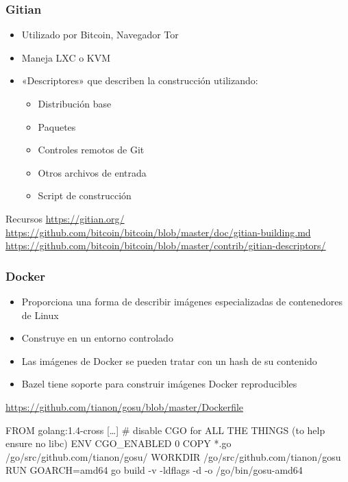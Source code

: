 \documentclass[14pt,aspectratio=169]{beamer}
\begin{document}
\begin{frame}
 \frametitle{Gitian}

 \begin{itemize}
  \item Utilizado por Bitcoin, Navegador Tor
  \item Maneja LXC o KVM
  \item «Descriptores» que describen la construcción utilizando:
   \begin{itemize}
    \item Distribución base
    \item Paquetes
    \item Controles remotos de Git
    \item Otros archivos de entrada
    \item Script de construcción
   \end{itemize}
 \end{itemize}

 \vfill
 \begin{block}{\footnotesize Recursos}\footnotesize
 \url{https://gitian.org/}\\
 \url{https://github.com/bitcoin/bitcoin/blob/master/doc/gitian-building.md}\\
 \url{https://github.com/bitcoin/bitcoin/blob/master/contrib/gitian-descriptors/}
 \end{block}
\end{frame}

\begin{frame}[fragile]
 \frametitle{Docker}

 \begin{itemize}
  \item Proporciona una forma de describir imágenes especializadas de contenedores de Linux
  \item Construye en un entorno controlado
  \item Las imágenes de Docker se pueden tratar con un hash de su contenido
  \item Bazel tiene soporte para construir imágenes Docker reproducibles
 \end{itemize}

 \begin{block}{\footnotesize \url{https://github.com/tianon/gosu/blob/master/Dockerfile}}\footnotesize
\begin{semiverbatim}
FROM golang:1.4-cross
[…]
# disable CGO for ALL THE THINGS (to help ensure no libc)
ENV CGO\_ENABLED 0
COPY *.go /go/src/github.com/tianon/gosu/
WORKDIR /go/src/github.com/tianon/gosu
RUN GOARCH=amd64 go build -v -ldflags -d -o /go/bin/gosu-amd64
\end{semiverbatim}
 \end{block}
\end{frame}
\end{document}

